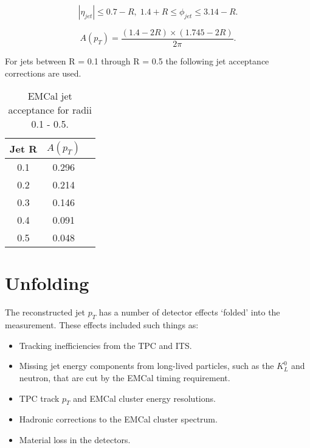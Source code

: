 \begin{equation}
|\eta_{jet}| \leq 0.7 - R, \; 1.4 + R \leq \phi_{jet} \leq 3.14 -R.
\label{eq:jetconstration}
\end{equation}

\begin{equation}
A(p_{T}) = \frac{(1.4 - 2R) \times (1.745 - 2R)}{2 \pi}.
\label{eq:acceptance}
\end{equation}

For jets between R = 0.1 through R = 0.5 the following jet acceptance corrections are used.

\begin{table}[hb]
\label{tab:AcceptanceFactor}
\begin{center}
\begin{tabular}[b]{|c|c|c|}
	\hline
	Jet R & $A(p_{T})$ \\ \hline
	0.1 & 0.296 \\ \hline
	0.2 & 0.214\\ \hline
	0.3 & 0.146\\ \hline
	0.4 & 0.091\\ \hline
	0.5 & 0.048\\ \hline
\end{tabular}
\end{center}
\caption{EMCal jet acceptance for radii 0.1 - 0.5.}
\end{table}



\section{Unfolding}

The reconstructed jet $p_{T}$ has a number of detector effects `folded' into the measurement.  These effects included such things as:

\begin{itemize}
\item Tracking inefficiencies from the TPC and ITS.
\item Missing jet energy components from long-lived particles, such as the $K^{0}_{L}$ and neutron, that are cut by the EMCal timing requirement.
\item TPC track $p_{T}$ and EMCal cluster energy resolutions.
\item Hadronic corrections to the EMCal cluster spectrum.
\item Material loss in the detectors.
\end{itemize}

